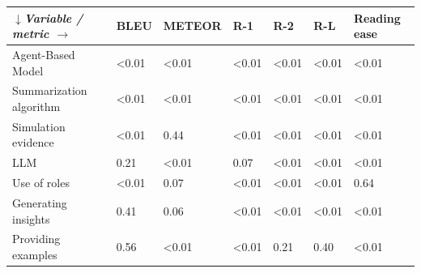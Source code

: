 \begin{tabular}{|l|l|l|l|l|l|l|}
\hline
\textit{$\downarrow$Variable / metric $\rightarrow$} & BLEU & METEOR & R-1 & R-2 & R-L & Reading ease \\
 \hline
 Agent-Based Model & \textless{}0.01 & \textless{}0.01 & \textless{}0.01 & \textless{}0.01 & \textless{}0.01 & \textless{}0.01 \\
 \hline
 Summarization algorithm & \textless{}0.01 & \textless{}0.01 & \textless{}0.01 & \textless{}0.01 & \textless{}0.01 & \textless{}0.01 \\
 \hline
 Simulation evidence & \textless{}0.01 & 0.44 & \textless{}0.01 & \textless{}0.01 & \textless{}0.01 & \textless{}0.01 \\
 \hline
 LLM & 0.21 & \textless{}0.01 & 0.07 & \textless{}0.01 & \textless{}0.01 & \textless{}0.01 \\
 \hline
 Use of roles & \textless{}0.01 & 0.07 & \textless{}0.01 & \textless{}0.01 & \textless{}0.01 & 0.64 \\
 \hline
 Generating insights & 0.41 & 0.06 & \textless{}0.01 & \textless{}0.01 & \textless{}0.01 & \textless{}0.01 \\
 \hline
 Providing examples & 0.56 & \textless{}0.01 & \textless{}0.01 & 0.21 & 0.40 & \textless{}0.01 \\
\hline
\end{tabular}
